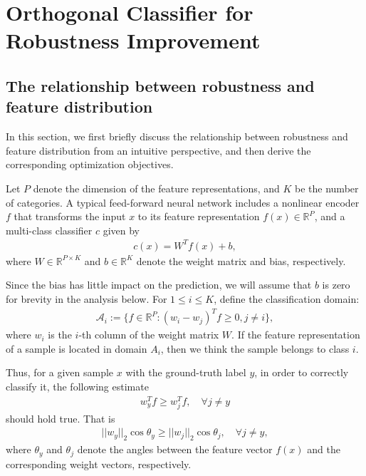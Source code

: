 \documentclass[preprint,review,12pt]{elsarticle}
\numberwithin{equation}{section}
\begin{document}
	
	
	
	
	
	\section{Orthogonal Classifier for Robustness Improvement }

	
	\subsection{The relationship between robustness and feature distribution}
	\label{sec:objectives}
	In this section, we first briefly discuss the relationship between robustness and feature distribution from an intuitive perspective,
	and then derive the corresponding optimization objectives.
	
	Let $ P $ denote the dimension of the feature representations, and $ K $ be the number of categories.
	A typical feed-forward neural network includes a nonlinear encoder $ f $ that
	transforms the input $x$ to its feature representation $f(x) \in \mathbb{R}^{P}$,
	and a multi-class classifier $ c $  given by
	\begin{align}
		c(x) = W^Tf(x) + b,
	\end{align}
	where $W \in \mathbb{R}^{P \times K}$ and $b \in \mathbb{R}^{K}$ denote the weight matrix and bias, respectively.


    Since the bias has little impact on the prediction,
    we will assume that $ b $ is zero for brevity  in the analysis below.
	For $ 1\leq i \leq K $, define the classification domain:
	\begin{align}
		\label{region}
		\mathcal{A}_i :=\{f \in \mathbb{R}^P: (w_i - w_j)^T f \ge 0, j \not = i \},
	\end{align}
	where $ w_i $ is the $ i $-th column of the weight matrix $W$.
	If the feature representation of a sample is located in domain $ A_i $,
    then we think the sample belongs to class $i $.
	
	
	Thus, for a given sample $ x $ with the ground-truth label $ y $,
    in order to correctly classify it,  the following estimate
	\begin{align}
		w_y^T f \geq  w_j^T f , \quad \forall j \not =y
	\end{align}
	should hold true. That is
	\begin{align}
		\label{normeq2}
		||w_y||_2 \cos \theta_y \geq  ||w_j||_2 \cos \theta_j , \quad \forall j \not =y,
	\end{align}
	where $ \theta_y$  and $\theta_{j} $  denote the angles between the feature vector $ f(x) $ and the corresponding weight vectors, respectively.
\end{document}
